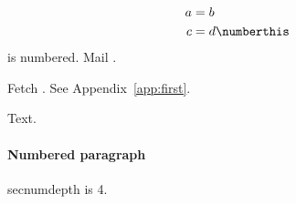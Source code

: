 \documentclass{article}
\begin{document}
\begin{align*}
  a &= b \\
  c &= d \numberthis\label{eq:cd}
\end{align*}
 is numbered.  Mail .

Fetch .  See Appendix~\ref{app:first}.

\label{app:first}
Text.
\paragraph{Numbered paragraph} \textcolor{OliveGreen}{secnumdepth is 4.}
\end{document}
